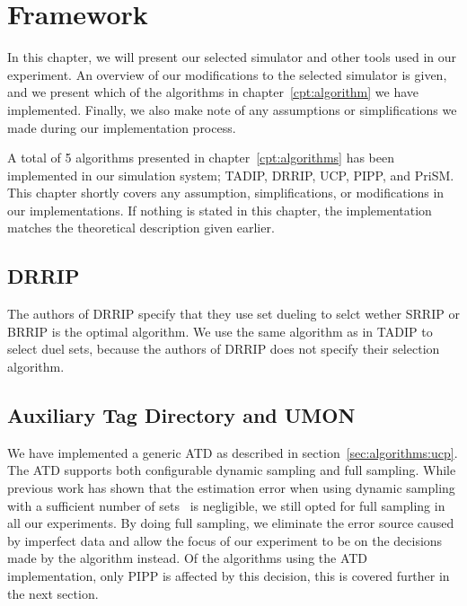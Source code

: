 \chapter{Framework}
\label{cpt:framework}

In this chapter, we will present our selected simulator and other tools used in our experiment.
An overview of our modifications to the selected simulator is given, and we present which of the algorithms in chapter~\ref{cpt:algorithm} we have implemented.
Finally, we also make note of any assumptions or simplifications we made during our implementation process.








A total of 5 algorithms presented in chapter~\ref{cpt:algorithms} has been implemented in our simulation system; TADIP, DRRIP, UCP, PIPP, and PriSM.
This chapter shortly covers any assumption, simplifications, or modifications in our implementations.
If nothing is stated in this chapter, the implementation matches the theoretical description given earlier.

\section{DRRIP}
The authors of DRRIP specify that they use set dueling to selct wether SRRIP or BRRIP is the optimal algorithm.
We use the same algorithm as in TADIP to select duel sets, because the authors of DRRIP does not specify their selection algorithm.

\section{Auxiliary Tag Directory and UMON}

We have implemented a generic ATD as described in section~\ref{sec:algorithms:ucp}.
The ATD supports both configurable dynamic sampling and full sampling.
While previous work has shown that the estimation error when using dynamic sampling with a sufficient number of sets~\cite{} is negligible, we still opted for full sampling in all our experiments.
By doing full sampling, we eliminate the error source caused by imperfect data and allow the focus of our experiment to be on the decisions made by the algorithm instead.
Of the algorithms using the ATD implementation, only PIPP is affected by this decision, this is covered further in the next section.

